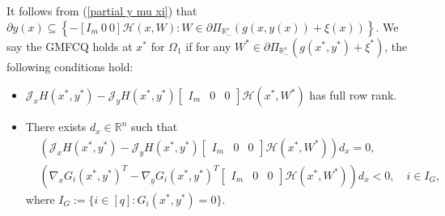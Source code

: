 \documentclass[11pt]{article}
\theoremstyle{definition}
\theoremstyle{remark}
\numberwithin{equation}{section}
\begin{document}
 It follows from (\ref{partial y mu xi}) that $\partial y(x)\subseteq\left\{ -[ I_m~ 0~ 0]\mathcal{H}(x,W):W\in \partial \Pi_{\mathbb{R}^s_{-}}(g(x,y(x))+\xi(x))  \right\}$.
 We say the GMFCQ holds at $x^*$ for $\Omega_1$
 if for any $ W^*\in
\partial\Pi_{\mathbb{R}_{-}^s}(g(x^*,y^*)+\xi^*)$, the following conditions hold:
\begin{itemize}
  \item [(i)]  $\mathcal{J}_xH(x^*,y^*)-\mathcal{J}_yH(x^*,y^*)[\begin{array}{ccc}
                                                              I_m & 0 & 0
                                                            \end{array}]\mathcal{H}(x^*,W^*)$ has full row rank.
  \item [(ii)]There exists $d_x\in \mathbb{R}^n$ such that
  \begin{align} \label{MFCQ-b}
   &    \left(\mathcal{J}_xH(x^*,y^*)-\mathcal{J}_yH(x^*,y^*)[\begin{array}{ccc}
                                                              I_m & 0 & 0
                                                            \end{array}]\mathcal{H}(x^*,W^*)\right)d_x=0, \\
\label{MFCQ-c}&  \left(\nabla_xG_i(x^*,y^*)^T-\nabla_yG_i(x^*,y^*)^T[\begin{array}{ccc}
                                                              I_m & 0 & 0
                                                            \end{array}]\mathcal{H}(x^*,W^*)\right)d_x<0,\quad
                                                            i\in I_{G},
  \end{align}
   where $I_G:=\{i\in[q]:G_i(x^*,y^*)=0\}$.
\end{itemize}
\end{document}
